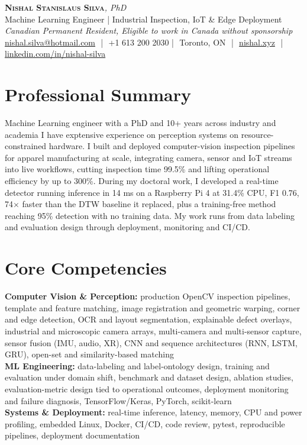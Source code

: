 \documentclass[11pt]{article}
\makeatletter
\newcommand{\cvName}{Nishal Stanislaus Silva}
\newcommand{\cvEmail}{nishal.silva@hotmail.com}
\newcommand{\cvPhone}{+1 613 200 2030}
\newcommand{\cvCity}{Toronto, ON}
\newcommand{\cvSite}{https://nishal.xyz}
\newcommand{\cvLinkedIn}{https://www.linkedin.com/in/nishal-silva}
\newcommand{\cvGitHub}{https://github.com/ns2max}
\newcommand{\cvStatus}{Canadian Permanent Resident, Eligible to work in Canada without sponsorship}
\newcommand{\cvTagline}{Machine Learning Engineer | Industrial Inspection, IoT \& Edge Deployment}
\makeatother
\begin{document}
\pagestyle{empty}
\begin{center}
    {\LARGE \scshape \textbf{\cvName}}{\large \textit{, PhD}}\\[1pt]
    {\small \cvTagline}\\[1pt]
    {\footnotesize\textit{\cvStatus}}\\[1pt]
    {\small
    \href{mailto:\cvEmail}{\cvEmail} \,\,|\,\, \cvPhone \,\,|\,\, \cvCity
    \,\,|\,\, \href{\cvSite}{nishal.xyz} \,\,|\,\, \href{\cvLinkedIn}{linkedin.com/in/nishal-silva}
    }
\end{center}

\section*{Professional Summary}

Machine Learning engineer with a PhD and 10+ years across industry and academia I have exptensive experience on perception systems on resource-constrained hardware. I built and deployed computer-vision inspection pipelines for apparel manufacturing at scale, integrating camera, sensor and IoT streams into live workflows, cutting inspection time 99.5\% and lifting operational efficiency by up to 300\%. During my doctoral work, I developed a real-time detector running inference in 14 ms on a Raspberry Pi 4 at 31.4\% CPU, F1 0.76, 74$\times$ faster than the DTW baseline it replaced, plus a training-free method reaching 95\% detection with no training data. My work runs from data labeling and evaluation design through deployment, monitoring and CI/CD.

\section*{Core Competencies}

\textbf{Computer Vision \& Perception:} production OpenCV inspection pipelines, template and feature matching, image registration and geometric warping, corner and edge detection, OCR and layout segmentation, explainable defect overlays, industrial and microscopic camera arrays, multi-camera and multi-sensor capture, sensor fusion (IMU, audio, XR), CNN and sequence architectures (RNN, LSTM, GRU), open-set and similarity-based matching\\
\textbf{ML Engineering:} data-labeling and label-ontology design, training and evaluation under domain shift, benchmark and dataset design, ablation studies, evaluation-metric design tied to operational outcomes, deployment monitoring and failure diagnosis, TensorFlow/Keras, PyTorch, scikit-learn\\
\textbf{Systems \& Deployment:} real-time inference, latency, memory, CPU and power profiling, embedded Linux, Docker, CI/CD, code review, pytest, reproducible pipelines, deployment documentation
\end{document}

